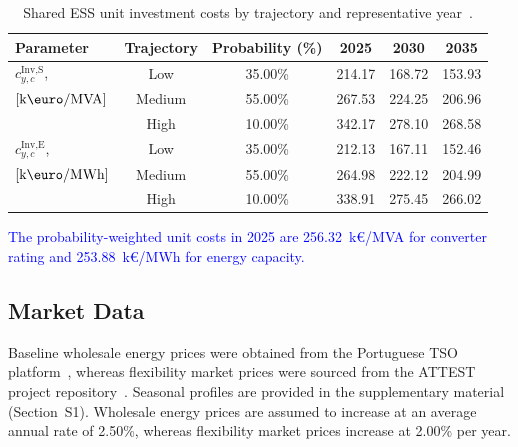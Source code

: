 \documentclass[preprint,12pt]{elsarticle}
\begin{document}
\begin{table}[htbp!]
    \centering    
    \caption{Shared ESS unit investment costs by trajectory and representative year~\cite{nrel_ess_costs}.}
    \begin{tabular}{lcc ccc}
        \toprule
        Parameter & Trajectory & Probability (\%) & 2025 & 2030 & 2035 \\
        \midrule
        $c^\text{Inv,S}_{y,c}$,             & Low       & 35.00\% & 214.17 & 168.72 & 153.93\\
        $\left[\text{k\euro/MVA}\right]$    & Medium    & 55.00\% & 267.53 & 224.25 & 206.96\\
        ~                                   & High      & 10.00\% & 342.17 & 278.10 & 268.58\\
        \midrule
        $c^\text{Inv,E}_{y,c}$,             & Low       & 35.00\% & 212.13 & 167.11 & 152.46\\
        $\left[\text{k\euro/MWh}\right]$    & Medium    & 55.00\% & 264.98 & 222.12 & 204.99\\
        ~                                   & High      & 10.00\% & 338.91 & 275.45 & 266.02\\
        \bottomrule
    \end{tabular}
    \label{tab:investment_cost}
\end{table}


\textcolor{blue}{
    The probability-weighted unit costs in 2025 are 256.32~k\euro{}/MVA for converter rating and 253.88~k\euro{}/MWh for energy capacity.
}

\subsection{Market Data}

Baseline wholesale energy prices were obtained from the Portuguese TSO platform~\cite{ren_market_platform}, whereas flexibility market prices were sourced from the ATTEST project repository~\cite{attest_project_repo}. Seasonal profiles are provided in the supplementary material (Section~S1). Wholesale energy prices are assumed to increase at an average annual rate of 2.50\%, whereas flexibility market prices increase at 2.00\% per year.
\end{document}
